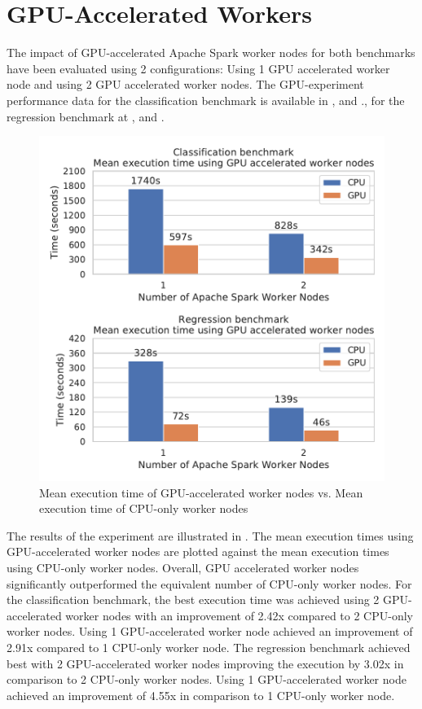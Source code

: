 \section{GPU-Accelerated Workers}
The impact of GPU-accelerated Apache Spark worker nodes for both benchmarks have been evaluated using 2 configurations: Using 1 GPU accelerated worker node and using 2 GPU accelerated worker nodes.
%
The GPU-experiment performance data for the classification benchmark is available in , and ., for the regression benchmark at , and .


\begin{figure}[h]
\centering
\includegraphics[scale=0.9]{images/07_evaluation/overall_cpu_vs_gpu}
\caption{Mean execution time of GPU-accelerated worker nodes vs. Mean execution time of CPU-only worker nodes}
\label{fig:07_gpu_results}
\end{figure}
The results of the experiment are illustrated in .
The mean execution times using GPU-accelerated worker nodes are plotted against the mean execution times using CPU-only worker nodes.
Overall, GPU accelerated worker nodes significantly outperformed the equivalent number of CPU-only worker nodes.
For the classification benchmark, the best execution time was achieved using 2 GPU-accelerated worker nodes with an improvement of 2.42x compared to 2 CPU-only worker nodes. Using 1 GPU-accelerated worker node achieved an improvement of 2.91x compared to 1 CPU-only worker node.
The regression benchmark achieved best with 2 GPU-accelerated worker nodes improving the execution by 3.02x in comparison to 2 CPU-only worker nodes. Using 1 GPU-accelerated worker node achieved an improvement of 4.55x in comparison to 1 CPU-only worker node.

